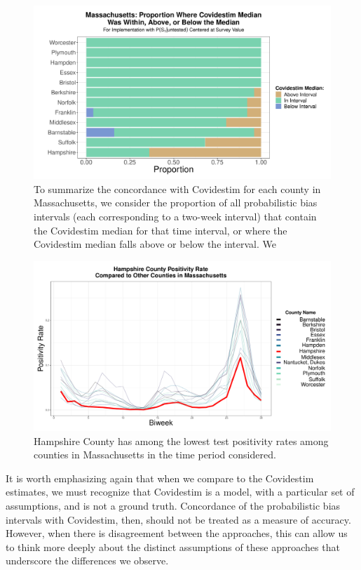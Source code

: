 \documentclass[12pt,twoside]{smiththesis}
\begin{document}
\begin{figure}
\includegraphics[width=1\linewidth]{figure/covidestim_above_below_by_county_ma} \caption{\label{fig:above-below-by-county-ma} To summarize the concordance with Covidestim for each county in Massachusetts, we consider the proportion of all probabilistic bias intervals (each corresponding to a two-week interval) that contain the Covidestim median for that time interval, or where the Covidestim median falls above or below the interval. We }\label{fig:unnamed-chunk-21}
\end{figure}
\begin{figure}
\includegraphics[width=0.9\linewidth]{figure/hampshire} \caption{\label{fig:hamp}Hampshire County has among the lowest test positivity rates among counties in Massachusetts in the time period considered.}\label{fig:unnamed-chunk-22}
\end{figure}
It is worth emphasizing again that when we compare to the Covidestim estimates, we must recognize that Covidestim is a model, with a particular set of assumptions, and is not a ground truth. Concordance of the probabilistic bias intervals with Covidestim, then, should not be treated as a measure of accuracy. However, when there is disagreement between the approaches, this can allow us to think more deeply about the distinct assumptions of these approaches that underscore the differences we observe.
\end{document}
